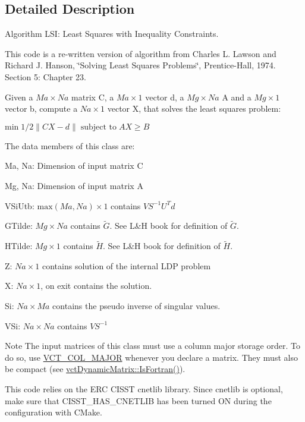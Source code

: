 \subsection{Detailed Description}
Algorithm L\-S\-I\-: Least Squares with Inequality Constraints.

This code is a re-\/written version of algorithm from Charles L. Lawson and Richard J. Hanson, \char`\"{}\-Solving Least Squares Problems\char`\"{}, Prentice-\/\-Hall, 1974. Section 5\-: Chapter 23.

Given a $Ma \times Na$ matrix C, a $Ma \times 1$ vector d, a $Mg \times Na$ A and a $Mg \times 1$ vector b, compute a $Na \times 1$ vector X, that solves the least squares problem\-:

$ \mbox{min} \; 1 / 2 \| CX - d \| \; \mbox{subject to} \; AX \geq B$

The data members of this class are\-:
\begin{DoxyItemize}
\item Ma, Na\-: Dimension of input matrix C
\item Mg, Na\-: Dimension of input matrix A
\item V\-Si\-Utb\-: $ \mbox{max}(Ma, Na) \times 1 $ contains $ VS^{-1}U^{T}d $
\item G\-Tilde\-: $ Mg \times Na $ contains $ \tilde{G} $. See L\&H book for definition of $ \tilde{G} $.
\item H\-Tilde\-: $ Mg \times 1 $ contains $ \tilde{H} $. See L\&H book for definition of $ \tilde{H} $.
\item Z\-: $ Na \times 1 $ contains solution of the internal L\-D\-P problem
\item X\-: $ Na \times 1 $, on exit contains the solution.
\item Si\-: $ Na \times Ma $ contains the pseudo inverse of singular values.
\item V\-Si\-: $ Na \times Na $ contains $ VS^{-1} $
\end{DoxyItemize}

\begin{DoxyNote}{Note}
The input matrices of this class must use a column major storage order. To do so, use \hyperlink{vct_forward_declarations_8h_a432cdf8923afaf82f551450ad4034746}{V\-C\-T\-\_\-\-C\-O\-L\-\_\-\-M\-A\-J\-O\-R} whenever you declare a matrix. They must also be compact (see \hyperlink{classvct_dynamic_const_matrix_base_aac5f19015b4888f760f99daa4bac199c}{vct\-Dynamic\-Matrix\-::\-Is\-Fortran()}).

This code relies on the E\-R\-C C\-I\-S\-S\-T cnetlib library. Since cnetlib is optional, make sure that C\-I\-S\-S\-T\-\_\-\-H\-A\-S\-\_\-\-C\-N\-E\-T\-L\-I\-B has been turned O\-N during the configuration with C\-Make. 
\end{DoxyNote}


